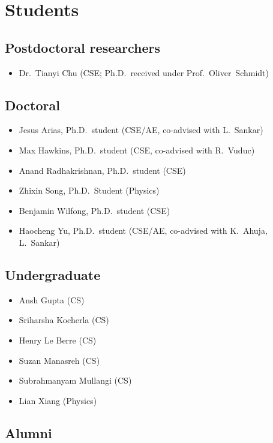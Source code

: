 \section{Students}

\subsection{Postdoctoral researchers}

\begin{itemize}
    \item Dr.\ Tianyi Chu (CSE; Ph.D.\ received under Prof.\ Oliver~Schmidt)
\end{itemize}

\subsection{Doctoral}

\begin{itemize}
    \item Jesus Arias, Ph.D.\ student (CSE/AE, co-advised with L.\ Sankar)
    \item Max Hawkins, Ph.D.\ student (CSE, co-advised with R.\ Vuduc)
    \item Anand Radhakrishnan, Ph.D.\ student (CSE)
    \item Zhixin Song, Ph.D.\ Student (Physics)
    \item Benjamin Wilfong, Ph.D.\ student (CSE)
    \item Haocheng Yu, Ph.D.\ student (CSE/AE, co-advised with K.\ Ahuja, L.\ Sankar)
\end{itemize}

\subsection{Undergraduate}

\begin{itemize}
    \item Ansh Gupta (CS)
    \item Sriharsha Kocherla (CS)
    \item Henry Le Berre (CS)
    \item Suzan Manasreh (CS)
    \item Subrahmanyam Mullangi (CS)
    \item Lian Xiang (Physics)
\end{itemize}

\subsection{Alumni}

